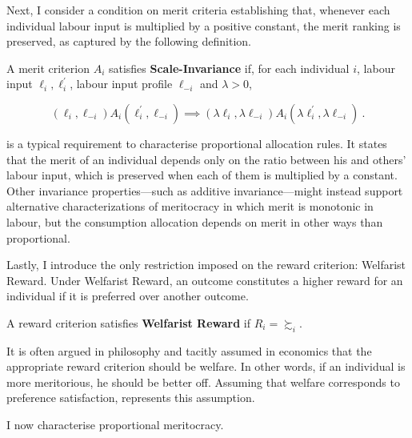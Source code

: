 Next, I consider a condition on merit criteria establishing that, whenever each individual labour input is multiplied by a positive constant, the merit ranking is preserved, as captured by the following definition.

\begin{definition}
	\label{def:scale}
	A merit criterion \( A_i \) satisfies \textbf{Scale-Invariance} if, for each individual \( i \), labour input \( \ell_i, \ell^{\prime}_{i} \), labour input profile \( \ell_{-i} \) and \( \lambda > 0 \),

	\[ ( \ell_i, \ell_{-i} ) A_i ( \ell^{\prime}_i, \ell_{-i} ) \implies ( \lambda \ell_i, \lambda \ell_{-i} ) A_i ( \lambda \ell^{\prime}_i, \lambda \ell_{-i} ) \: .\]
\end{definition}

 is a typical requirement to characterise proportional allocation rules. It states that the merit of an individual depends only on the ratio between his and others' labour input, which is preserved when each of them is multiplied by a constant. Other invariance properties—such as additive invariance—might instead support alternative characterizations of meritocracy in which merit is monotonic in labour, but the consumption allocation depends on merit in other ways than proportional.

Lastly, I introduce the only restriction imposed on the reward criterion: Welfarist Reward. Under Welfarist Reward, an outcome constitutes a higher reward for an individual if it is preferred over another outcome.

\begin{definition}\label{def:welfrew}
	A reward criterion satisfies \textbf{Welfarist Reward} if \( R_i = \succsim_i \).
\end{definition}

It is often argued in philosophy \citep{arnesonDesertEquality2007,kaganGeometryDesert2014} and tacitly assumed in economics that the appropriate reward criterion should be welfare. In other words, if an individual is more meritorious, he should be better off. Assuming that welfare corresponds to preference satisfaction,  represents this assumption.

I now characterise proportional meritocracy.

